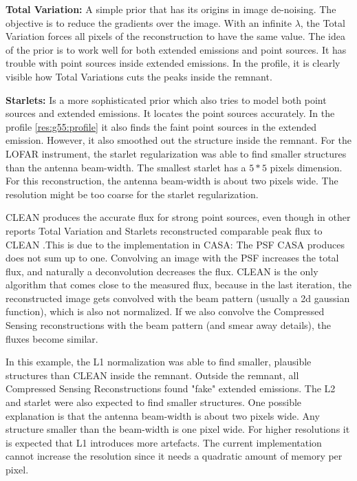 \textbf{Total Variation:} A simple prior that has its origins in image de-noising. The objective is to reduce the gradients over the image. With an infinite $\lambda$, the Total Variation forces all pixels of the reconstruction to have the same value. The idea of the prior is to work well for both extended emissions and point sources. It has trouble with point sources inside extended emissions. In the profile, it is clearly visible how Total Variations cuts the peaks inside the remnant.

\textbf{Starlets:} Is a more sophisticated prior which also tries to model both point sources and extended emissions. It locates the point sources accurately. In the profile \ref{res:g55:profile} it also finds the faint point sources in the extended emission. However, it also smoothed out the structure inside the remnant. For the LOFAR instrument, the starlet regularization was able to find smaller structures than the antenna beam-width\cite{girard2015sparse}. The smallest starlet has a $5*5$ pixels dimension. For this reconstruction, the antenna beam-width is about two pixels wide. The resolution might be too coarse for the starlet regularization.

CLEAN produces the accurate flux for strong point sources, even though in other reports Total Variation and Starlets reconstructed comparable peak flux to CLEAN \cite{garsden2015lofar}\cite{mcewen2011compressed}.This is due to the implementation in CASA: The PSF CASA produces does not sum up to one. Convolving an image with the PSF increases the total flux, and naturally a deconvolution decreases the flux. CLEAN is the only algorithm that comes close to the measured flux, because in the last iteration, the reconstructed image gets convolved with the beam pattern (usually a 2d gaussian function), which is also not normalized. If we also convolve the Compressed Sensing reconstructions with the beam pattern (and smear away details), the fluxes become similar.

In this example, the L1 normalization was able to find smaller, plausible structures than CLEAN inside the remnant. Outside the remnant, all Compressed Sensing Reconstructions found "fake" extended emissions. The L2 and starlet were also expected to find smaller structures. One possible explanation is that the antenna beam-width is about two pixels wide. Any structure smaller than the beam-width is one pixel wide. For higher resolutions it is expected that L1 introduces more artefacts. The current implementation cannot increase the resolution since it needs a quadratic amount of memory per pixel.

